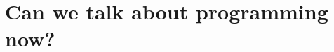 \documentclass[../../../programming-introduction.tex]{subfiles}
\begin{document}
    \section{Can we talk about programming now?}\label{section:can-we-talk-about-programming-now}
    
\end{document}
